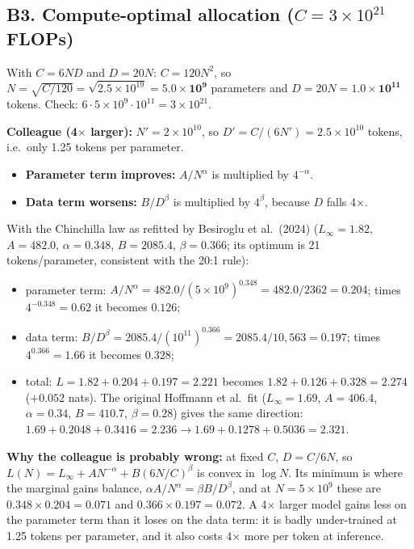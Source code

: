 \subsection*{B3. Compute-optimal allocation ($C=3\times10^{21}$ FLOPs)}
With $C=6ND$ and $D=20N$: $C=120N^2$, so $N=\sqrt{C/120}=\sqrt{2.5\times10^{19}}=\mathbf{5.0\times10^{9}}$ parameters and $D=20N=\mathbf{1.0\times10^{11}}$ tokens. Check: $6\cdot5\times10^9\cdot10^{11}=3\times10^{21}$.

\textbf{Colleague (4$\times$ larger):} $N'=2\times10^{10}$, so $D'=C/(6N')=2.5\times10^{10}$ tokens, i.e.\ only 1.25 tokens per parameter.
\begin{itemize}[leftmargin=*,nosep]
\item \textbf{Parameter term improves:} $A/N^{\alpha}$ is multiplied by $4^{-\alpha}$.
\item \textbf{Data term worsens:} $B/D^{\beta}$ is multiplied by $4^{\beta}$, because $D$ falls 4$\times$.
\end{itemize}
With the Chinchilla law as refitted by Besiroglu et al.\ (2024) ($L_\infty=1.82$, $A=482.0$, $\alpha=0.348$, $B=2085.4$, $\beta=0.366$; its optimum is 21 tokens/parameter, consistent with the 20:1 rule):
\begin{itemize}[leftmargin=*,nosep]
\item parameter term: $A/N^{\alpha}=482.0/(5\times10^9)^{0.348}=482.0/2362=0.204$; times $4^{-0.348}=0.62$ it becomes $0.126$;
\item data term: $B/D^{\beta}=2085.4/(10^{11})^{0.366}=2085.4/10{,}563=0.197$; times $4^{0.366}=1.66$ it becomes $0.328$;
\item total: $L=1.82+0.204+0.197=2.221$ becomes $1.82+0.126+0.328=2.274$ ($+0.052$ nats). The original Hoffmann et al.\ fit ($L_\infty=1.69$, $A=406.4$, $\alpha=0.34$, $B=410.7$, $\beta=0.28$) gives the same direction: $1.69+0.2048+0.3416=2.236\rightarrow1.69+0.1278+0.5036=2.321$.
\end{itemize}
\textbf{Why the colleague is probably wrong:} at fixed $C$, $D=C/6N$, so $L(N)=L_\infty+AN^{-\alpha}+B(6N/C)^{\beta}$ is convex in $\log N$. Its minimum is where the marginal gains balance, $\alpha A/N^{\alpha}=\beta B/D^{\beta}$, and at $N=5\times10^9$ these are $0.348\times0.204=0.071$ and $0.366\times0.197=0.072$. A 4$\times$ larger model gains less on the parameter term than it loses on the data term: it is badly under-trained at 1.25 tokens per parameter, and it also costs 4$\times$ more per token at inference.

